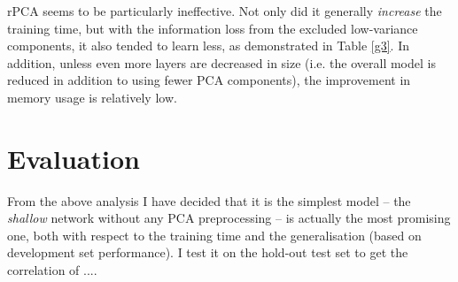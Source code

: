\documentclass[10pt, twocolumn]{article}
\begin{document}
rPCA seems to be particularly ineffective. Not only did it generally \textit{increase} the training time, but with the information loss from the excluded low-variance components, it also tended to learn less, as demonstrated in Table \ref{g3}. In addition, unless even more layers are decreased in size (i.e. the overall model is reduced in addition to using fewer PCA components), the improvement in memory usage is relatively low. 


\section{Evaluation}
From the above analysis I have decided that it is the simplest model – the \textit{shallow} network without any PCA preprocessing – is actually the most promising one, both with respect to the training time and the generalisation (based on development set performance). I test it on the hold-out test set to get the correlation of ....


\medskip
 


\end{document}
